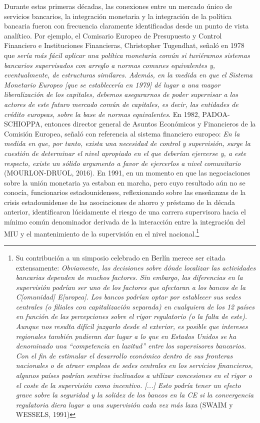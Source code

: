 \documentclass[10pt,a4paper]{article}
\begin{document}
{Durante estas primeras décadas, las conexiones entre un mercado único de servicios bancarios, la integración monetaria y la integración de la política bancaria fueron con frecuencia claramente identificadas desde un punto de vista analítico. Por ejemplo, el Comisario Europeo de Presupuesto y Control Financiero e Instituciones Financieras, Christopher Tugendhat, señaló en 1978 que \textit{sería más fácil aplicar una política monetaria común si tuviéramos sistemas bancarios supervisados con arreglo a normas comunes equivalentes y, eventualmente, de estructuras similares. Además, en la medida en que el Sistema Monetario Europeo [que se establecería en 1979] dé lugar a una mayor liberalización de los capitales, debemos asegurarnos de poder supervisar a los actores de este futuro mercado común de capitales, es decir, las entidades de crédito europeas, sobre la base de normas equivalentes}. En 1982, PADOA-SCHIOPPA, entonces director general de Asuntos Económicos y Financieros de la Comisión Europea, señaló con referencia al sistema financiero europeo: \textit{En la medida en que, por tanto, exista una necesidad de control y supervisión, surge la cuestión de determinar el nivel apropiado en el que deberían ejercerse y, a este respecto, existe un sólido argumento a favor de ejercerlos a nivel comunitario} (MOURLON-DRUOL, 2016). En 1991, en un momento en que las negociaciones sobre la unión monetaria ya estaban en marcha, pero cuyo resultado aún no se conocía, funcionarios estadounidenses, reflexionando sobre las enseñanzas de la crisis estadounidense de las asociaciones de ahorro y préstamo de la década anterior, identificaron lúcidamente el riesgo de una carrera supervisora hacia el mínimo común denominador derivada de la interacción entre la integración del MIU y el mantenimiento de la supervisión en el nivel nacional.\footnote{%
    Su contribución a un simposio celebrado en Berlín merece ser citada extensamente: \textit{Obviamente, las decisiones sobre dónde localizar las actividades bancarias dependen de muchos factores. Sin embargo, las diferencias en la supervisión podrían ser uno de los factores que afectaran a los bancos de la C[omunidad] E[uropea]. Los bancos podrían optar por establecer sus sedes centrales (o filiales con capitalización separada) en cualquiera de los 12 países en función de las percepciones sobre el rigor regulatorio (o la falta de este). Aunque nos resulta difícil juzgarlo desde el exterior, es posible que intereses regionales también pudieran dar lugar a lo que en Estados Unidos se ha denominado una “competencia en laxitud” entre los supervisores bancarios. Con el fin de estimular el desarrollo económico dentro de sus fronteras nacionales o de atraer empleos de sedes centrales en los servicios financieros, algunos países podrían sentirse inclinados a utilizar concesiones en el rigor o el coste de la supervisión como incentivo. [...] Esto podría tener un efecto grave sobre la seguridad y la solidez de los bancos en la CE si la convergencia regulatoria diera lugar a una supervisión cada vez más laxa} (SWAIM y WESSELS, 1991)
}

}
\end{document}
